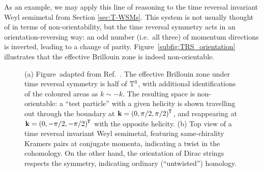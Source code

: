 As an example, we may apply this line of reasoning to the time reversal invariant Weyl semimetal from Section \ref{sec:T-WSMs}. This system is not usually thought of in terms of non-orientability, but the time reversal symmetry acts in an orientation-reversing way: an odd number (i.e.\ all three) of momentum directions is inverted, leading to a change of parity. Figure~\ref{subfig:TRS_orientation} illustrates that the effective Brillouin zone is indeed non-orientable.
\begin{figure}[htb!]
	\centering
	\hfil
	\caption{(a) Figure~adapted from Ref.~\cite{Thiang_equivariant}. The effective Brillouin zone under time reversal symmetry is half of $\mathbb{T}^3$, with additional identifications of the coloured areas as $k\sim -k$. The resulting space is non-orientable: a ``test particle'' with a given helicity is shown travelling out through the boundary at $\vb{k} = (0,\pi/2,\pi/2)^{\mkern-1.5mu\mathsf{T}}$, and reappearing at $\vb{k} = (0,-\pi/2,-\pi/2)^{\mkern-1.5mu\mathsf{T}}$ with the opposite helicity. (b) Top view of a time reversal invariant Weyl semimetal, featuring same-chirality Kramers pairs at conjugate momenta, indicating a twist in the cohomology. On the other hand, the orientation of Dirac strings respects the symmetry, indicating ordinary (``untwisted'') homology.}
	\label{fig:TRS_twist}
\end{figure}
